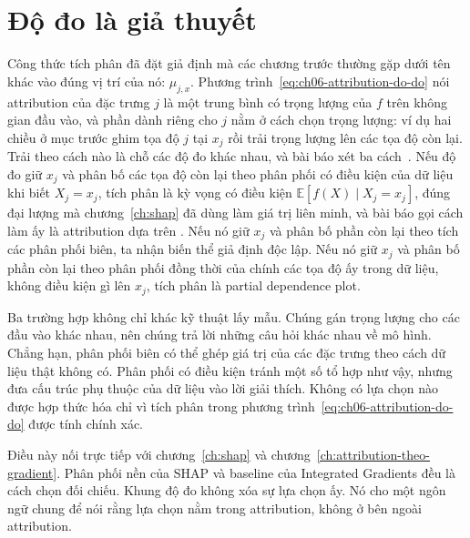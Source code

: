 \section{Độ đo là giả thuyết}
\label{sec:ch06-do-do-la-gia-thuyet}

%
%
Công thức tích phân đã đặt giả định mà các chương trước thường gặp dưới tên
khác vào đúng vị trí của nó:  $\mu_{j,x}$. Phương
trình~\ref{eq:ch06-attribution-do-do} nói attribution của đặc trưng $j$ là một
trung bình có trọng lượng của $f$ trên không gian đầu vào, và phần dành riêng
cho $j$ nằm ở cách chọn trọng lượng: ví dụ hai chiều ở mục trước ghim tọa độ
$j$ tại $x_j$ rồi trải trọng lượng lên các tọa độ còn lại. Trải theo cách nào
là chỗ các độ đo khác nhau, và bài báo xét ba cách~\autocite{p17firstprinciples}. Nếu
độ đo giữ $x_j$ và phân bố các tọa độ còn lại theo phân phối có điều kiện của
dữ liệu khi biết $X_j=x_j$, tích phân là kỳ vọng có điều kiện
$\mathbb{E}[f(X)\mid X_j=x_j]$, đúng đại lượng mà chương~\ref{ch:shap} đã
dùng làm giá trị liên minh, và bài báo gọi cách làm ấy là attribution dựa trên
. Nếu nó giữ $x_j$ và phân bố phần còn lại theo tích
các phân phối biên, ta nhận biến thể giả định độc lập. Nếu nó giữ $x_j$ và phân
bố phần còn lại theo phân phối đồng thời của chính các tọa độ ấy trong dữ liệu,
không điều kiện gì lên $x_j$, tích phân là partial dependence plot.

Ba trường hợp không chỉ khác kỹ thuật lấy mẫu. Chúng gán trọng lượng cho các
đầu vào khác nhau, nên chúng trả lời những câu hỏi khác nhau về mô hình. Chẳng
hạn, phân phối biên có thể ghép giá trị của các đặc trưng theo cách dữ liệu
thật không có. Phân phối có điều kiện tránh một số tổ hợp như vậy, nhưng đưa
cấu trúc phụ thuộc của dữ liệu vào lời giải thích. Không có lựa chọn nào được
hợp thức hóa chỉ vì tích phân trong phương trình~\ref{eq:ch06-attribution-do-do}
được tính chính xác.

Điều này nối trực tiếp với chương~\ref{ch:shap} và chương~\ref{ch:attribution-theo-gradient}.
Phân phối nền của SHAP và baseline của Integrated Gradients đều là cách chọn
đối chiếu. Khung độ đo không xóa sự lựa chọn ấy. Nó cho một ngôn ngữ chung để
nói rằng lựa chọn nằm trong attribution, không ở bên ngoài attribution.
